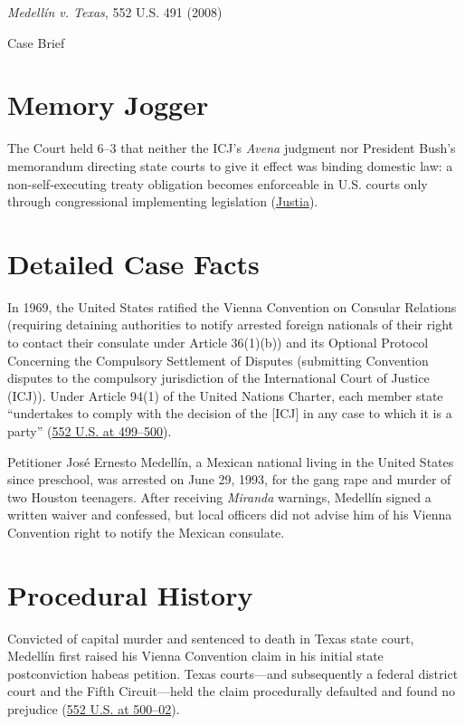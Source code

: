 \documentclass[12pt]{article}
\begin{document}
\begin{center}
{\LARGE \textit{Medell\'{i}n v. Texas}, 552 U.S. 491 (2008)\par}
\vspace{0.8em}
{\large Case Brief\par}
\end{center}
\vspace{1em}

\section{Memory Jogger}
The Court held 6--3 that neither the ICJ's \textit{Avena} judgment nor President Bush's memorandum directing state courts to give it effect was binding domestic law: a non-self-executing treaty obligation becomes enforceable in U.S. courts only through congressional implementing legislation (\href{https://supreme.justia.com/cases/federal/us/552/491/}{Justia}).

\section{Detailed Case Facts}
In 1969, the United States ratified the Vienna Convention on Consular Relations (requiring detaining authorities to notify arrested foreign nationals of their right to contact their consulate under Article 36(1)(b)) and its Optional Protocol Concerning the Compulsory Settlement of Disputes (submitting Convention disputes to the compulsory jurisdiction of the International Court of Justice (ICJ)). Under Article 94(1) of the United Nations Charter, each member state ``undertakes to comply with the decision of the [ICJ] in any case to which it is a party'' (\href{https://supreme.justia.com/cases/federal/us/552/491/}{552 U.S. at 499--500}).

Petitioner Jos\'{e} Ernesto Medell\'{i}n, a Mexican national living in the United States since preschool, was arrested on June 29, 1993, for the gang rape and murder of two Houston teenagers. After receiving \textit{Miranda} warnings, Medell\'{i}n signed a written waiver and confessed, but local officers did not advise him of his Vienna Convention right to notify the Mexican consulate.

\section{Procedural History}
Convicted of capital murder and sentenced to death in Texas state court, Medell\'{i}n first raised his Vienna Convention claim in his initial state postconviction habeas petition. Texas courts---and subsequently a federal district court and the Fifth Circuit---held the claim procedurally defaulted and found no prejudice (\href{https://supreme.justia.com/cases/federal/us/552/491/}{552 U.S. at 500--02}).
\end{document}

